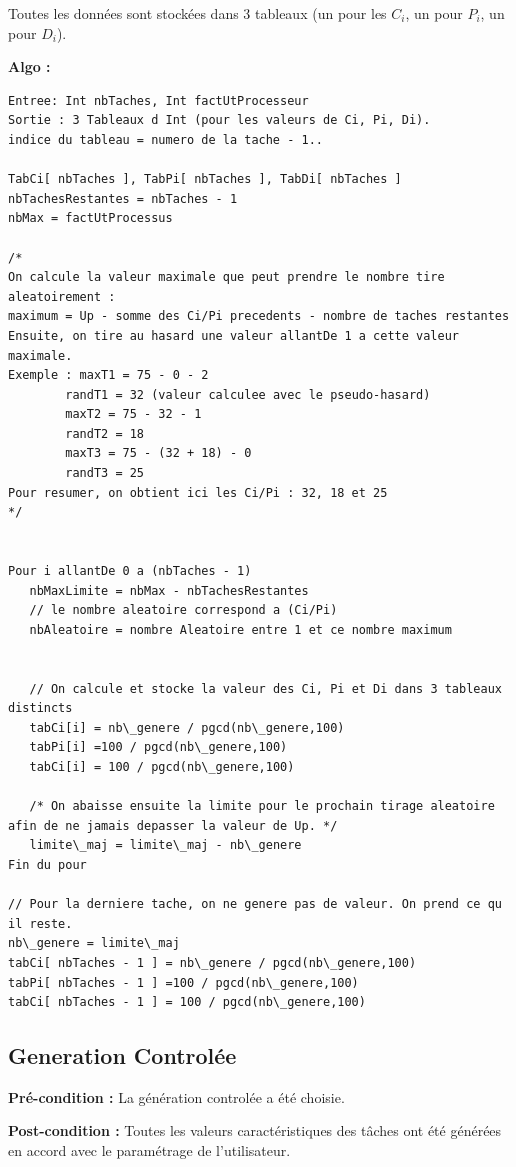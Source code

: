 		    Toutes les données sont stockées dans 3 tableaux (un pour les $C_i$, un pour $P_i$, un pour $D_i$). 

			\textbf{Algo :}
			\begin{lstlisting}
Entree: Int nbTaches, Int factUtProcesseur
Sortie : 3 Tableaux d Int (pour les valeurs de Ci, Pi, Di). 
indice du tableau = numero de la tache - 1..

TabCi[ nbTaches ], TabPi[ nbTaches ], TabDi[ nbTaches ]
nbTachesRestantes = nbTaches - 1
nbMax = factUtProcessus 

/*
On calcule la valeur maximale que peut prendre le nombre tire aleatoirement :
maximum = Up - somme des Ci/Pi precedents - nombre de taches restantes
Ensuite, on tire au hasard une valeur allantDe 1 a cette valeur maximale.
Exemple : maxT1 = 75 - 0 - 2
	    randT1 = 32 (valeur calculee avec le pseudo-hasard)
	    maxT2 = 75 - 32 - 1
	    randT2 = 18
	    maxT3 = 75 - (32 + 18) - 0
	    randT3 = 25
Pour resumer, on obtient ici les Ci/Pi : 32, 18 et 25
*/


Pour i allantDe 0 a (nbTaches - 1)
   nbMaxLimite = nbMax - nbTachesRestantes
   // le nombre aleatoire correspond a (Ci/Pi)
   nbAleatoire = nombre Aleatoire entre 1 et ce nombre maximum


   // On calcule et stocke la valeur des Ci, Pi et Di dans 3 tableaux distincts
   tabCi[i] = nb\_genere / pgcd(nb\_genere,100)
   tabPi[i] =100 / pgcd(nb\_genere,100)
   tabCi[i] = 100 / pgcd(nb\_genere,100)
	        
   /* On abaisse ensuite la limite pour le prochain tirage aleatoire afin de ne jamais depasser la valeur de Up. */
   limite\_maj = limite\_maj - nb\_genere
Fin du pour

// Pour la derniere tache, on ne genere pas de valeur. On prend ce qu il reste.
nb\_genere = limite\_maj
tabCi[ nbTaches - 1 ] = nb\_genere / pgcd(nb\_genere,100)
tabPi[ nbTaches - 1 ] =100 / pgcd(nb\_genere,100)
tabCi[ nbTaches - 1 ] = 100 / pgcd(nb\_genere,100)
			\end{lstlisting}

		\subsection{Generation Controlée}  
			\textbf{Pré-condition :} La génération controlée a été choisie.
		
			\textbf{Post-condition :} Toutes les valeurs caractéristiques des tâches ont été générées en accord avec le paramétrage de l’utilisateur.
		
